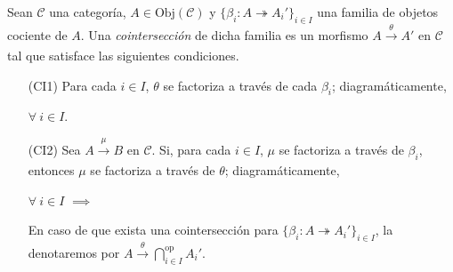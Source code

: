 \documentclass[tesis]{subfiles}
\begin{document}
\begin{Def}\label{Mendoza-Ejer.35}
    Sean $\mathscr{C}$ una categoría, $A\in\text{Obj}(\mathscr{C})$ y $\{\beta_i:A\twoheadrightarrow A_i'\}_{i\in I}$ una familia de objetos cociente de $A$. Una \emph{cointersección} de dicha familia es un morfismo $A\xrightarrow[]{\theta} A'$ en $\mathscr{C}$ tal que satisface las siguientes condiciones.

    \begin{itemize}
        \item[(CI1)] Para cada $i\in I$, $\theta$ se factoriza a través de cada $\beta_i$; diagramáticamente,
            \begin{center}
                \quad $\forall \ i\in I$.
            \end{center}

        \item[(CI2)] Sea $A\xrightarrow[]{\mu} B$ en $\mathscr{C}$. Si, para cada $i\in I$, $\mu$ se factoriza a través de $\beta_i$, entonces $\mu$ se factoriza a través de $\theta$; diagramáticamente,
            \begin{center}
                \quad $\forall \ i\in I$ \quad $\implies$ \quad
            \end{center}
            En caso de que exista una cointersección para $\{\beta_i:A\twoheadrightarrow A_i'\}_{i\in I}$, la denotaremos por $A\xrightarrow[]{\theta}\bigcap_{i\in I}^{\text{op}}A_i'$.
    \end{itemize}
\end{Def}
\end{document}
